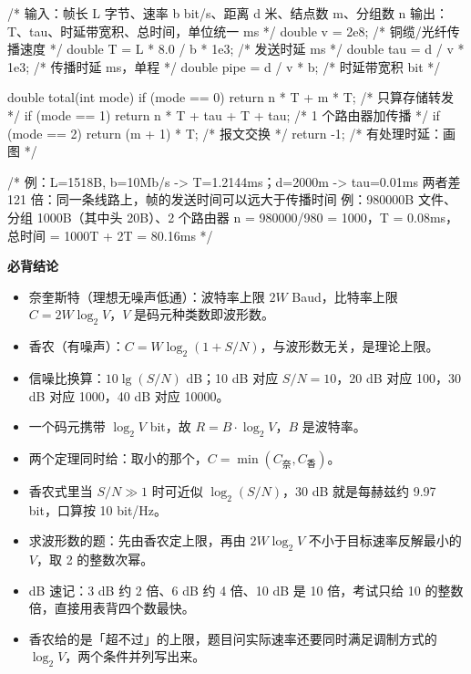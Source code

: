 \documentclass[10pt,a4paper]{ctexart}
\begin{document}
\begin{codebox}
/* 输入：帧长 L 字节、速率 b bit/s、距离 d 米、结点数 m、分组数 n
   输出：T、tau、时延带宽积、总时间，单位统一 ms */
double v = 2e8;                     /* 铜缆/光纤传播速度 */
double T   = L * 8.0 / b * 1e3;     /* 发送时延 ms */
double tau = d / v * 1e3;           /* 传播时延 ms，单程 */
double pipe = d / v * b;            /* 时延带宽积 bit */

double total(int mode) {
    if (mode == 0) return n * T + m * T;              /* 只算存储转发 */
    if (mode == 1) return n * T + tau + T + tau;      /* 1 个路由器加传播 */
    if (mode == 2) return (m + 1) * T;                /* 报文交换 */
    return -1;                                        /* 有处理时延：画图 */
}

/* 例：L=1518B, b=10Mb/s -> T=1.2144ms；d=2000m -> tau=0.01ms
   两者差 121 倍：同一条线路上，帧的发送时间可以远大于传播时间
   例：980000B 文件、分组 1000B（其中头 20B）、2 个路由器
       n = 980000/980 = 1000，T = 0.08ms，总时间 = 1000T + 2T = 80.16ms */
\end{codebox}




\textbf{必背结论}

\begin{itemize}

\item 奈奎斯特（理想无噪声低通）：波特率上限 $2W$ Baud，比特率上限 $C = 2W\log_2 V$，$V$ 是码元种类数即波形数。

\item 香农（有噪声）：$C = W\log_2(1+S/N)$，与波形数无关，是理论上限。

\item 信噪比换算：$10\lg(S/N)$ dB；10 dB 对应 $S/N=10$，20 dB 对应 100，30 dB 对应 1000，40 dB 对应 10000。

\item 一个码元携带 $\log_2 V$ bit，故 $R = B \cdot \log_2 V$，$B$ 是波特率。

\item 两个定理同时给：取小的那个，$C = \min(C_{\text{奈}}, C_{\text{香}})$。

\item 香农式里当 $S/N \gg 1$ 时可近似 $\log_2(S/N)$，30 dB 就是每赫兹约 9.97 bit，口算按 10 bit/Hz。

\item 求波形数的题：先由香农定上限，再由 $2W\log_2 V$ 不小于目标速率反解最小的 $V$，取 2 的整数次幂。

\item dB 速记：3 dB 约 2 倍、6 dB 约 4 倍、10 dB 是 10 倍，考试只给 10 的整数倍，直接用表背四个数最快。

\item 香农给的是「超不过」的上限，题目问实际速率还要同时满足调制方式的 $\log_2 V$，两个条件并列写出来。

\end{itemize}
\end{document}
